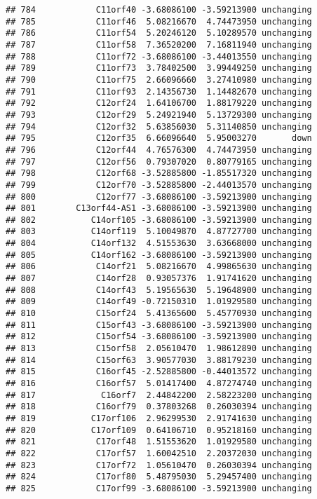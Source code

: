\documentclass[]{article}
\begin{document}
\begin{verbatim}
## 784            C11orf40 -3.68086100 -3.59213900 unchanging
## 785            C11orf46  5.08216670  4.74473950 unchanging
## 786            C11orf54  5.20246120  5.10289570 unchanging
## 787            C11orf58  7.36520200  7.16811940 unchanging
## 788            C11orf72 -3.68086100 -3.44013550 unchanging
## 789            C11orf73  3.78402500  3.99449250 unchanging
## 790            C11orf75  2.66096660  3.27410980 unchanging
## 791            C11orf93  2.14356730  1.14482670 unchanging
## 792            C12orf24  1.64106700  1.88179220 unchanging
## 793            C12orf29  5.24921940  5.13729300 unchanging
## 794            C12orf32  5.63856030  5.31140850 unchanging
## 795            C12orf35  6.66096640  5.95003270       down
## 796            C12orf44  4.76576300  4.74473950 unchanging
## 797            C12orf56  0.79307020  0.80779165 unchanging
## 798            C12orf68 -3.52885800 -1.85517320 unchanging
## 799            C12orf70 -3.52885800 -2.44013570 unchanging
## 800            C12orf77 -3.68086100 -3.59213900 unchanging
## 801        C13orf44-AS1 -3.68086100 -3.59213900 unchanging
## 802           C14orf105 -3.68086100 -3.59213900 unchanging
## 803           C14orf119  5.10049870  4.87727700 unchanging
## 804           C14orf132  4.51553630  3.63668000 unchanging
## 805           C14orf162 -3.68086100 -3.59213900 unchanging
## 806            C14orf21  5.08216670  4.99865630 unchanging
## 807            C14orf28  0.93057376  1.91741620 unchanging
## 808            C14orf43  5.19565630  5.19648900 unchanging
## 809            C14orf49 -0.72150310  1.01929580 unchanging
## 810            C15orf24  5.41365600  5.45770930 unchanging
## 811            C15orf43 -3.68086100 -3.59213900 unchanging
## 812            C15orf54 -3.68086100 -3.59213900 unchanging
## 813            C15orf58  2.05610470  1.98612890 unchanging
## 814            C15orf63  3.90577030  3.88179230 unchanging
## 815            C16orf45 -2.52885800 -0.44013572 unchanging
## 816            C16orf57  5.01417400  4.87274740 unchanging
## 817             C16orf7  2.44842200  2.58223200 unchanging
## 818            C16orf79  0.37803268  0.26030394 unchanging
## 819           C17orf106  2.96299530  2.91741630 unchanging
## 820           C17orf109  0.64106710  0.95218160 unchanging
## 821            C17orf48  1.51553620  1.01929580 unchanging
## 822            C17orf57  1.60042510  2.20372030 unchanging
## 823            C17orf72  1.05610470  0.26030394 unchanging
## 824            C17orf80  5.48795030  5.29457400 unchanging
## 825            C17orf99 -3.68086100 -3.59213900 unchanging

\end{verbatim}
\end{document}
